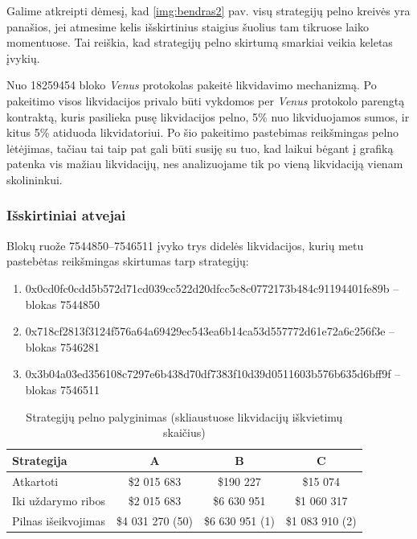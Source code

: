 \documentclass{VUMIFPSkursinis}
\begin{document}
Galime atkreipti dėmesį, kad \ref{img:bendras2} pav. visų strategijų pelno kreivės yra panašios, jei atmesime kelis išskirtinius staigius šuolius tam tikruose laiko momentuose. Tai reiškia, kad strategijų pelno skirtumą smarkiai veikia keletas įvykių.

Nuo 18259454 \cite{LikvidacijosKontraktas} bloko \textit{Venus} protokolas pakeitė likvidavimo mechanizmą. Po pakeitimo visos likvidacijos privalo būti vykdomos per \textit{Venus} protokolo parengtą kontraktą, kuris pasilieka pusę likvidacijos pelno, 5\% nuo likviduojamos sumos, ir kitus 5\% atiduoda likvidatoriui. Po šio pakeitimo pastebimas reikšmingas pelno lėtėjimas, tačiau tai taip pat gali būti susiję su tuo, kad laikui bėgant į grafiką patenka vis mažiau likvidacijų, nes analizuojame tik po vieną likvidaciją vienam skolininkui.

\subsubsection{Išskirtiniai atvejai}

Blokų ruože 7544850–7546511 įvyko trys didelės likvidacijos, kurių metu pastebėtas reikšmingas skirtumas tarp strategijų:

\begin{enumerate}[label=\textbf{\Alph*.}]
    \item 0x0cd0fc0cdd5b572d71cd039cc522d20dfcc5c8c0772173b484c91194401fe89b – blokas 7544850
    \item 0x718cf2813f3124f576a64a69429ec543ea6b14ca53d557772d61e72a6c256f3e – blokas 7546281
    \item 0x3b04a03ed356108c7297e6b438d70df7383f10d39d0511603b576b635d6bff9f – blokas 7546511
\end{enumerate}

\begin{table}[h!]
  \centering
  \caption{Strategijų pelno palyginimas (skliaustuose likvidacijų iškvietimų skaičius)}
  \label{tab:profit_table}
  \begin{tabular}{|l|c|c|c|}
  \hline
  \textbf{Strategija}        & \textbf{A}          & \textbf{B}          & \textbf{C}          \\ \hline
  Atkartoti                  & \$2 015 683      & \$190 227       & \$15 074        \\ \hline
  Iki uždarymo ribos         & \$2 015 683      & \$6 630 951      & \$1 060 317      \\ \hline
  Pilnas išeikvojimas        & \$4 031 270 (50)      & \$6 630 951 (1)      & \$1 083 910 (2)      \\ \hline
  \end{tabular}
  \end{table}
\end{document}
